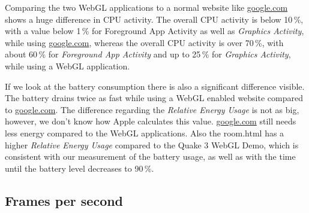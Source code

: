 \documentclass[12pt,journal,compsoc]{IEEEtran}
\begin{document}
Comparing the two WebGL applications to a normal website like \url{google.com} shows a huge difference in CPU activity. The overall CPU activity is below 10\,\%, with a value below 1\,\% for Foreground App Activity as well as \textit{Graphics Activity}, while using \url{google.com}, whereas the overall CPU activity is over 70\,\%, with about 60\,\% for \textit{Foreground App Activity} and up to 25\,\% for \textit{Graphics Activity}, while using a WebGL application. 

If we look at the battery consumption there is also a significant difference visible. The battery drains twice as fast while using a WebGL enabled website compared to \url{google.com}. The difference regarding the \textit{Relative Energy Usage} is not as big, however, we don't know how Apple calculates this value. \url{google.com} still needs less energy compared to the WebGL applications. Also the room.html has a higher \textit{Relative Energy Usage} compared to the Quake 3 WebGL Demo, which is consistent with our measurement of the battery usage, as well as with the time until the battery level decreases to 90\,\%.


\subsection{Frames per second}
\end{document}
